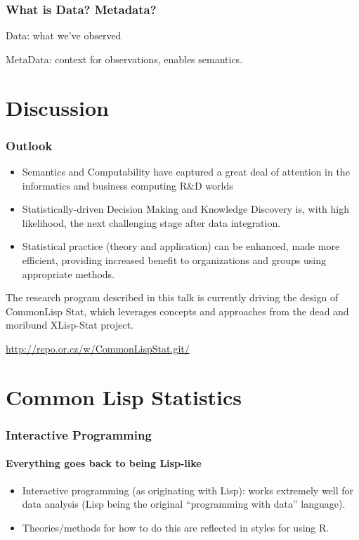 \documentclass{beamer}
\begin{document}
\begin{frame}
  \frametitle{What is Data?  Metadata?}

  Data: what we've observed

  MetaData: context for observations, enables semantics.
\end{frame}


\section{Discussion}

\begin{frame}
  \frametitle{Outlook}
  \begin{itemize}
  \item Semantics and Computability have captured a great deal of
    attention in the informatics and business computing R\&D worlds
  \item Statistically-driven Decision Making and Knowledge Discovery
    is, with high likelihood, the next challenging stage after data
    integration.
  \item Statistical practice (theory and application) can be enhanced,
    made more efficient, providing  increased benefit to organizations
    and groups using appropriate methods.
  \end{itemize}

  The research program described in this talk is currently driving the
  design of CommonLisp Stat, which leverages concepts and approaches
  from the dead and moribund XLisp-Stat project.

  \url{http://repo.or.cz/w/CommonLispStat.git/}
\end{frame}

\section{Common Lisp Statistics}

\begin{frame}
  \frametitle{Interactive Programming}
  \framesubtitle{Everything goes back to being Lisp-like}
  \begin{itemize}
  \item Interactive programming (as originating with Lisp): works
    extremely well for data analysis (Lisp being the original
    ``programming with data'' language).
  \item Theories/methods for how to do this are reflected in styles
    for using R.
  \end{itemize}
\end{frame}
\end{document}
